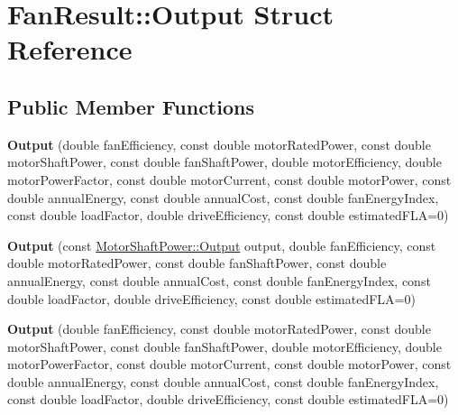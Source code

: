 \hypertarget{struct_fan_result_1_1_output}{}\section{Fan\+Result\+:\+:Output Struct Reference}
\label{struct_fan_result_1_1_output}
\subsection*{Public Member Functions}
\begin{DoxyCompactItemize}
\item 
\mbox{\label{struct_fan_result_1_1_output_ac4dd55df5e54acf32b19f7d003798d8b}} 
{\bfseries Output} (double fan\+Efficiency, const double motor\+Rated\+Power, const double motor\+Shaft\+Power, const double fan\+Shaft\+Power, double motor\+Efficiency, double motor\+Power\+Factor, const double motor\+Current, const double motor\+Power, const double annual\+Energy, const double annual\+Cost, const double fan\+Energy\+Index, const double load\+Factor, double drive\+Efficiency, const double estimated\+F\+LA=0)
\item 
\mbox{\label{struct_fan_result_1_1_output_a103b3489c1962b9698293bc029bb1bbe}} 
{\bfseries Output} (const \hyperlink{struct_motor_shaft_power_1_1_output}{Motor\+Shaft\+Power\+::\+Output} output, double fan\+Efficiency, const double motor\+Rated\+Power, const double fan\+Shaft\+Power, const double annual\+Energy, const double annual\+Cost, const double fan\+Energy\+Index, const double load\+Factor, double drive\+Efficiency, const double estimated\+F\+LA=0)
\item 
\mbox{\label{struct_fan_result_1_1_output_ac4dd55df5e54acf32b19f7d003798d8b}} 
{\bfseries Output} (double fan\+Efficiency, const double motor\+Rated\+Power, const double motor\+Shaft\+Power, const double fan\+Shaft\+Power, double motor\+Efficiency, double motor\+Power\+Factor, const double motor\+Current, const double motor\+Power, const double annual\+Energy, const double annual\+Cost, const double fan\+Energy\+Index, const double load\+Factor, double drive\+Efficiency, const double estimated\+F\+LA=0)
\item 
\mbox{\label{struct_fan_result_1_1_output_a103b3489c1962b9698293bc029bb1bbe}} 

\end{DoxyCompactItemize}
